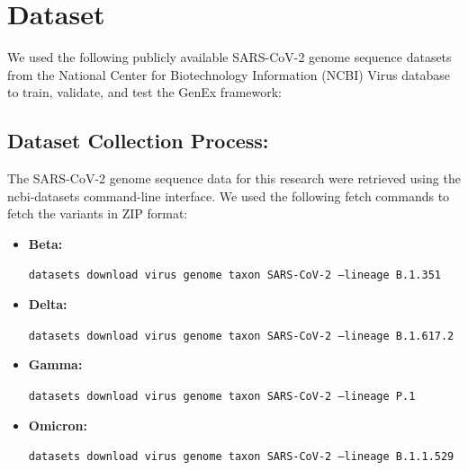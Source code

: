 \documentclass[conference]{IEEEtran}
\begin{document}
\begin{table}[t]
\centering
\caption{Comparison of Prior Work and Proposed Method}
\label{tab:prior_comparison}
\end{table}





\section{Dataset}
\label{sec:data}
We used the following publicly available SARS-CoV-2 genome sequence datasets from the National Center for Biotechnology Information (NCBI)\cite{ncbi} Virus database to train, validate, and test the GenEx framework:

\subsection{Dataset Collection Process:}
The SARS-CoV-2 genome sequence data for this research were retrieved using the ncbi-datasets command-line interface. We used the following fetch commands to fetch the variants in ZIP format:

\begin{itemize}
    \item \textbf{Beta:} {\raggedright\texttt{datasets download virus genome taxon SARS-CoV-2 --lineage B.1.351}\cite{ncbi}\par}
    \item \textbf{Delta:} {\raggedright\texttt{datasets download virus genome taxon SARS-CoV-2 --lineage B.1.617.2}\cite{ncbi}\par}
    \item \textbf{Gamma:} {\raggedright\texttt{datasets download virus genome taxon SARS-CoV-2 --lineage P.1}\cite{ncbi}\par}
    \item \textbf{Omicron:} {\raggedright\texttt{datasets download virus genome taxon SARS-CoV-2 --lineage B.1.1.529}\cite{ncbi}\par}
\end{itemize}
\end{document}

